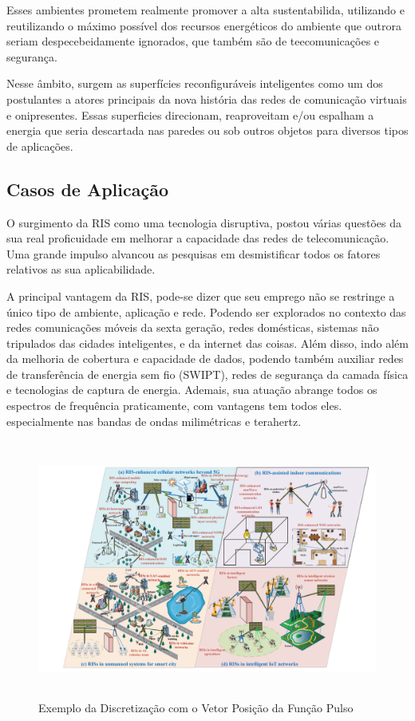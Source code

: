 \documentclass[
	12pt,				%
	openright,			%
	oneside,			%
	a4paper,			%
	english,			%
	brazil				%
	]{abntex2}
\begin{document}
Esses ambientes prometem realmente promover a alta sustentabilida, utilizando e reutilizando o máximo possível dos recursos energéticos do ambiente que outrora seriam despecebeidamente ignorados, que também são de teecomunicações e segurança.

Nesse âmbito, surgem as superfícies reconfiguráveis inteligentes como um dos postulantes a atores principais da nova história das redes de comunicação virtuais e onipresentes. Essas superficies direcionam, reaproveitam e/ou espalham a energia que seria descartada nas paredes ou sob outros objetos para diversos tipos de aplicações.

\subsection{Casos de Aplicação} 

O surgimento da RIS como uma tecnologia disruptiva, postou várias questões da sua real proficuidade em melhorar a capacidade das redes de telecomunicação. Uma grande impulso alvancou as pesquisas em desmistificar todos os fatores relativos as sua aplicabilidade.

A principal vantagem da RIS, pode-se dizer que seu emprego não se restringe a único tipo de ambiente, aplicação e rede. Podendo ser explorados no contexto das redes comunicações móveis da sexta geração, redes domésticas, sistemas não tripulados das cidades inteligentes, e da internet das coisas. Além disso,  indo além da melhoria de cobertura e capacidade de dados, podendo também auxiliar redes de transferência de energia sem fio (SWIPT), redes de segurança da camada física e tecnologias de captura de energia.
Ademais, sua atuação abrange todos os espectros de frequência praticamente, com vantagens tem todos eles. especialmente nas bandas de ondas milimétricas e terahertz.

\begin{figure}[htb]
 \label{RISUseCases}
 \centering
  \begin{minipage}{\textwidth}
    \centering
    \caption{Exemplo da Discretização com o Vetor Posição da Função Pulso} \label{fig_minipage_imagem2}
    \includegraphics[width=14cm, height=8.5cm]{figures/RISusecases.png}
  \end{minipage}
  \hfill

\end{figure}
\end{document}
